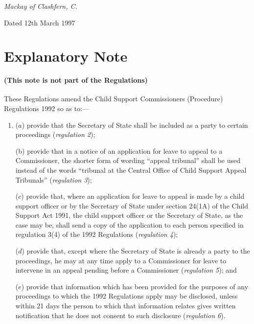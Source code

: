 \documentclass[12pt,a4paper]{article}
\begin{document}
\bigskip


{\raggedleft
\emph{Mackay of Clashfern, C.}%

}

Dated 12th March 1997

\small

\part{Explanatory Note}

\renewcommand\parthead{--- Explanatory Note}

\subsection*{(This note is not part of the Regulations)}

These Regulations amend the Child Support Commissioners (Procedure) Regulations 1992 so as to:—
\begin{enumerate}\item[]
 ($a$) provide that the Secretary of State shall be included as a party to certain proceedings (\emph{regulation 2});

 (b) provide that in a notice of an application for leave to appeal to a Commissioner, the shorter form of wording “appeal tribunal” shall be used instead of the words “tribunal at the Central Office of Child Support Appeal Tribunals” (\emph{regulation 3});

 ($c$) provide that, where an application for leave to appeal is made by a child support officer or by the Secretary of State under section 24(1A) of the Child Support Act 1991, the child support officer or the Secretary of State, as the case may be, shall send a copy of the application to each person specified in regulation 3(4) of the 1992 Regulations (\emph{regulation 4});

 ($d$) provide that, except where the Secretary of State is already a party to the proceedings, he may at any time apply to a Commissioner for leave to intervene in an appeal pending before a Commissioner (\emph{regulation 5}); and

 ($e$) provide that information which has been provided for the purposes of any proceedings to which the 1992 Regulations apply may be disclosed, unless within 21 days the person to which that information relates gives written notification that he does not consent to such disclosure (\emph{regulation 6}).
\end{enumerate}
\end{document}
